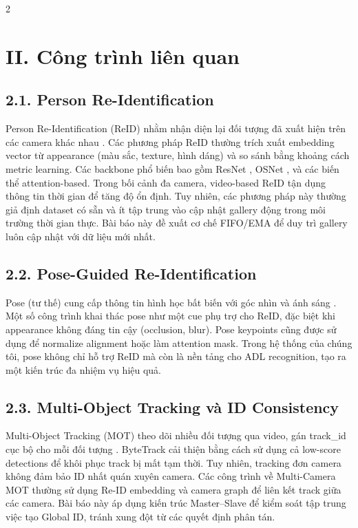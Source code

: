 \documentclass[a4paper,13pt]{article}
\begin{document}
\begin{multicols}{2}
\section*{II. Công trình liên quan}

\subsection*{2.1. Person Re-Identification}
Person Re-Identification (ReID) nhằm nhận diện lại đối tượng đã xuất hiện trên các camera khác nhau \cite{zheng2015scalable}. Các phương pháp ReID thường trích xuất embedding vector từ appearance (màu sắc, texture, hình dáng) và so sánh bằng khoảng cách metric learning. Các backbone phổ biến bao gồm ResNet \cite{he2016resnet}, OSNet \cite{zhou2019osnet}, và các biến thể attention-based. Trong bối cảnh đa camera, video-based ReID \cite{zheng2015scalable} tận dụng thông tin thời gian để tăng độ ổn định. Tuy nhiên, các phương pháp này thường giả định dataset có sẵn và ít tập trung vào cập nhật gallery động trong môi trường thời gian thực. Bài báo này đề xuất cơ chế FIFO/EMA để duy trì gallery luôn cập nhật với dữ liệu mới nhất.

\subsection*{2.2. Pose-Guided Re-Identification}
Pose (tư thế) cung cấp thông tin hình học bất biến với góc nhìn và ánh sáng \cite{cao2017openpose}. Một số công trình khai thác pose như một cue phụ trợ cho ReID, đặc biệt khi appearance không đáng tin cậy (occlusion, blur). Pose keypoints cũng được sử dụng để normalize alignment hoặc làm attention mask. Trong hệ thống của chúng tôi, pose không chỉ hỗ trợ ReID mà còn là nền tảng cho ADL recognition, tạo ra một kiến trúc đa nhiệm vụ hiệu quả.

\subsection*{2.3. Multi-Object Tracking và ID Consistency}
Multi-Object Tracking (MOT) theo dõi nhiều đối tượng qua video, gán track\_id cục bộ cho mỗi đối tượng \cite{bewley2016sort}. ByteTrack \cite{zhang2022bytetrack} cải thiện bằng cách sử dụng cả low-score detections để khôi phục track bị mất tạm thời. Tuy nhiên, tracking đơn camera không đảm bảo ID nhất quán xuyên camera. Các công trình về Multi-Camera MOT \cite{ristani2016mtmc} thường sử dụng Re-ID embedding và camera graph để liên kết track giữa các camera. Bài báo này áp dụng kiến trúc Master--Slave để kiểm soát tập trung việc tạo Global ID, tránh xung đột từ các quyết định phân tán.


\end{multicols}
\end{document}
